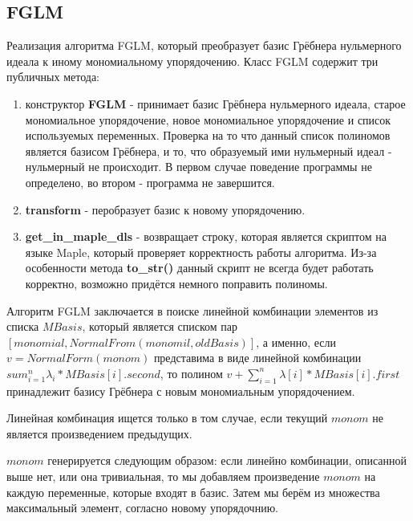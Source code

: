 \documentclass{article}
\begin{document}
\subsection{FGLM}
Реализация алгоритма FGLM, который преобразует базис Грёбнера нульмерного идеала к иному мономиальному упорядочению.
Класс FGLM содержит три публичных метода:
\begin{enumerate}
    \item конструктор \textbf{FGLM} - принимает базис Грёбнера нульмерного идеала, старое мономиальное упорядочение, новое мономиальное упорядочение и список используемых переменных.
    Проверка на то что данный список полиномов является базисом Грёбнера, и то, что образуемый ими нульмерный идеал - нульмерный не происходит. В первом случае поведение программы не определено, 
    во втором - программа не завершится.  
    \item \textbf{transform} - перобразует базис к новому упорядочению. 
    \item \textbf{get\_in\_maple\_dls} - возвращает строку, которая является скриптом на языке Maple, который проверяет корректность работы алгоритма. Из-за особенности метода \textbf{to\_str()} 
    данный скрипт не всегда будет работать корректно, возможно придётся немного поправить полиномы.
\end{enumerate} 

Алгоритм FGLM заключается в поиске линейной комбинации элементов из списка $MBasis$, который является списком
пар $[monomial, NormalFrom(monomil, oldBasis)]$, а именно, если $v = NormalForm(monom)$ представима в виде
линейной комбинации $sum_{i=1}^n \lambda_i * MBasis[i].second$, то полином $v+\sum_{i=1}^n \lambda[i]*MBasis[i].first$ принадлежит базису Грёбнера 
с новым мономиальным упорядочением.

Линейная комбинация ищется только в том случае, если текущий $monom$ не является произведением предыдущих.

$monom$ генерируется следующим образом: если линейно комбинации, описанной выше нет, или она тривиальная, то мы добавляем произведение
$monom$ на каждую переменные, которые входят в базис. Затем мы берём из множества максимальный элемент, согласно новому упорядочнию.
\end{document}

